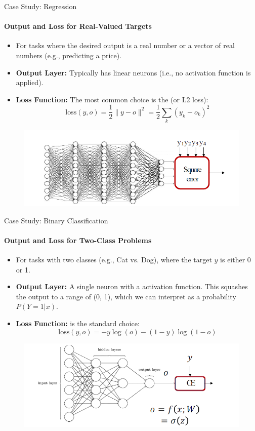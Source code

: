 \begin{frame}{Case Study: Regression}
    \framesubtitle{Output and Loss for Real-Valued Targets}
    \begin{itemize}
        \item For tasks where the desired output is a real number or a vector of real numbers (e.g., predicting a price).
        \item \textbf{Output Layer:} Typically has linear neurons (i.e., no activation function is applied).
        \item \textbf{Loss Function:} The most common choice is the  (or L2 loss):
        \[
            \text{loss}(y, o) = \frac{1}{2} \|y - o\|^2 = \frac{1}{2} \sum_k (y_k - o_k)^2
        \]
    \end{itemize}
    \begin{figure}
        \centering
        \includegraphics[width=0.8\linewidth]{images/loss_regression.png}
    \end{figure}
\end{frame}

\begin{frame}{Case Study: Binary Classification}
    \framesubtitle{Output and Loss for Two-Class Problems}
    \begin{itemize}
        \item For tasks with two classes (e.g., Cat vs. Dog), where the target $y$ is either 0 or 1.
        \item \textbf{Output Layer:} A single neuron with a  activation function. This squashes the output to a range of (0, 1), which we can interpret as a probability $P(Y=1|x)$.
        \item \textbf{Loss Function:}  is the standard choice:
        \[
            \text{loss}(y, o) = -y \log(o) - (1 - y) \log(1 - o)
        \]
    \end{itemize}
    \begin{figure}
        \centering
        \includegraphics[width=0.6\linewidth]{images/loss_binary_ce.png}
    \end{figure}
\end{frame}

